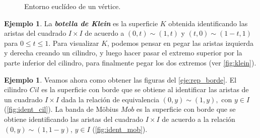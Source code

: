 \documentclass[10pt]{report}
\newcommand{\enfatiza}[1]{\textbf{\textit{#1}}}
\theoremstyle{definition}
\newtheorem{eje}[defin]{Ejemplo}
\begin{document}
\begin{figure}
\caption{Entorno euclídeo de un vértice.\label{fig:6.4}}
\end{figure}

\begin{eje}%
La \enfatiza{botella de Klein} es la superficie $K$ obtenida identificando las aristas del cuadrado $I\times I$ de acuerdo a $(0,t)\sim (1,t)$ y $(t,0)\sim (1-t,1)$ para $0\leq t\leq 1$.  Para visualizar $K$, podemos pensar en pegar las aristas izquierda y derecha creando un cilindro, y luego hacer pasar el extremo superior por la parte inferior del cilindro, para finalmente pegar los dos extremos (ver \autoref{fig:klein}).
\end{eje}

\begin{eje}\label{eje:rep_mobius}
Veamos ahora como obtener las figuras del \autoref{eje:rep_borde}. El cilindro $Cil$ es la superficie con borde que se obtiene al identificar las aristas de un cuadrado $I\times I$ dada la relación de equivalencia $(0,y)\sim (1,y),$ con $y\in I$ (\autoref{fig:ident_cil}). La banda de Möbius $Mob$ es la superficie con borde que se obtiene identificando las aristas del cuadrado $I\times I$ de acuerdo a la relación $(0,y)\sim (1,1-y)$, $y\in I$ (\autoref{fig:ident_mob}).
\end{eje}
\end{document}
